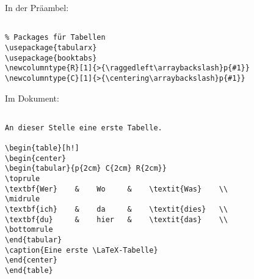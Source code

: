 
In der Präambel:

\begin{verbatim}

% Packages für Tabellen
\usepackage{tabularx}
\usepackage{booktabs}
\newcolumntype{R}[1]{>{\raggedleft\arraybackslash}p{#1}}
\newcolumntype{C}[1]{>{\centering\arraybackslash}p{#1}}

\end{verbatim}

\tcblower

Im Dokument: 

\begin{verbatim}

An dieser Stelle eine erste Tabelle.

\begin{table}[h!]
\begin{center}
\begin{tabular}{p{2cm} C{2cm} R{2cm}}
\toprule
\textbf{Wer}    &    Wo     &    \textit{Was}    \\ 
\midrule
\textbf{ich}    &    da     &    \textit{dies}   \\  
\textbf{du}     &    hier   &    \textit{das}    \\ 
\bottomrule
\end{tabular}
\caption{Eine erste \LaTeX-Tabelle}
\end{center}
\end{table}

\end{verbatim}
